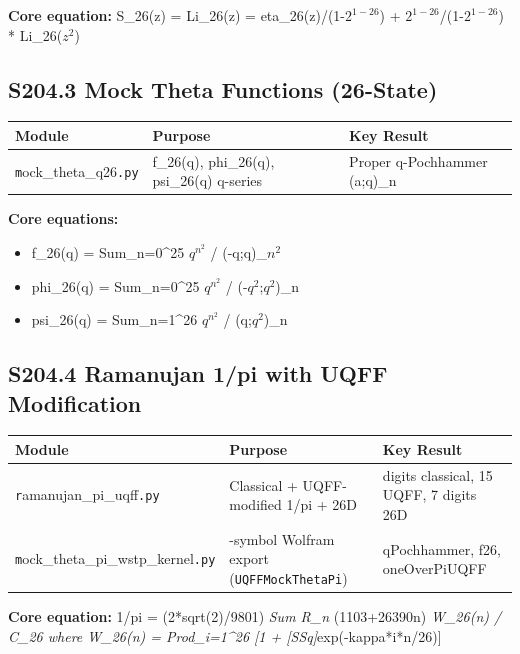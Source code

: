 \documentclass[12pt,a4paper]{article}
\begin{document}
\textbf{Core equation:} S\_26(z) = Li\_26(z) = eta\_26(z)/(1-$2^{1-26}$) + $2^{1-26}$/(1-$2^{1-26}$) * Li\_26($z^{2}$)

\subsection{S204.3 Mock Theta Functions (26-State)}

\begin{table}[H]
\centering
\small
\begin{tabularx}{\linewidth}{@{}>{\raggedright\arraybackslash}X>{\raggedright\arraybackslash}X>{\raggedright\arraybackslash}X@{}}
\toprule
Module & Purpose & Key Result \tabularnewline
\midrule
\texttt{m}ock\_{theta\_q26}\texttt{.py} & f\_26(q), phi\_26(q), psi\_26(q) q-series & Proper q-Pochhammer (a;q)\_n \tabularnewline
\bottomrule
\end{tabularx}
\end{table}

\textbf{Core equations:}

\begin{itemize}
  \item f\_26(q) = Sum\_{n=0}\^{}{25} $q^{n^2}$ / (-q;q)\_$n^{2}$
  \item phi\_26(q) = Sum\_{n=0}\^{}{25} $q^{n^2}$ / (-$q^{2}$;$q^{2}$)\_n
  \item psi\_26(q) = Sum\_{n=1}\^{}{26} $q^{n^2}$ / (q;$q^{2}$)\_n
\end{itemize}

\subsection{S204.4 Ramanujan 1/pi with UQFF Modification}

\begin{table}[H]
\centering
\small
\begin{tabularx}{\linewidth}{@{}>{\raggedright\arraybackslash}X>{\raggedright\arraybackslash}X>{\raggedright\arraybackslash}X@{}}
\toprule
Module & Purpose & Key Result \tabularnewline
\midrule
\texttt{r}amanujan\_{pi\_uqff}\texttt{.py} & Classical + UQFF-modified 1/pi + 26D & 21 digits classical, 15 UQFF, 7 digits 26D \tabularnewline
\texttt{m}ock\_{theta\_pi\_wstp\_kernel}\texttt{.py} & 9-symbol Wolfram export (\texttt{UQFFMockThetaPi}) & qPochhammer, f26, oneOverPiUQFF \tabularnewline
\bottomrule
\end{tabularx}
\end{table}

\textbf{Core equation:} 1/pi = (2*sqrt(2)/9801) \emph{ Sum R\_n } (1103+26390n) \emph{ W\_26(n) / C\_26 where W\_26(n) = Prod\_{i=1}\^{}{26} [1 + [SSq]}exp(-kappa*i*n/26)]
\end{document}
